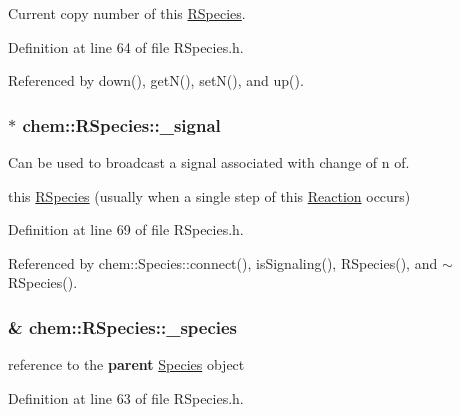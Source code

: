 Current copy number of this \hyperlink{classchem_1_1RSpecies}{R\-Species}. 



Definition at line 64 of file R\-Species.\-h.



Referenced by down(), get\-N(), set\-N(), and up().

\hypertarget{classchem_1_1RSpecies_acd60296c77857284cd935cb6faaf4200}{
\subsubsection[{\-\_\-signal}]{$\ast$ {\bf chem\-::\-R\-Species\-::\-\_\-signal}}}\label{classchem_1_1RSpecies_acd60296c77857284cd935cb6faaf4200}


Can be used to broadcast a signal associated with change of n of. 

this \hyperlink{classchem_1_1RSpecies}{R\-Species} (usually when a single step of this \hyperlink{classchem_1_1Reaction}{Reaction} occurs) 

Definition at line 69 of file R\-Species.\-h.



Referenced by chem\-::\-Species\-::connect(), is\-Signaling(), R\-Species(), and $\sim$\-R\-Species().

\hypertarget{classchem_1_1RSpecies_a3a979b9226800417c7aad81a2162fac5}{
\subsubsection[{\-\_\-species}]{\& {\bf chem\-::\-R\-Species\-::\-\_\-species}}}\label{classchem_1_1RSpecies_a3a979b9226800417c7aad81a2162fac5}


reference to the {\bfseries parent} \hyperlink{classchem_1_1Species}{Species} object 



Definition at line 63 of file R\-Species.\-h.




